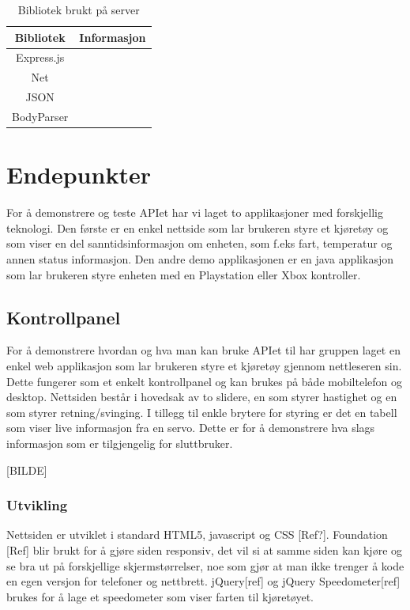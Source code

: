 \documentclass[12pt]{report}
\begin{document}
\begin{table}[H]
	\begin{tabular}{|c|c|}
		\hline 
		\textbf{Bibliotek }& \textbf{Informasjon} \\ 
		\hline 
		Express.js &   \\ 
		\hline 
		Net &  \\ 
		\hline 
		JSON &  	\\ 
		\hline 
		BodyParser &  	\\  
		\hline 
	\end{tabular} 
	\centering
	\caption{Bibliotek brukt på server}
	\label{serverBibliotek}
\end{table}

\chapter{Endepunkter}
For å demonstrere og teste APIet har vi laget to applikasjoner med forskjellig teknologi. Den første er en enkel nettside som lar brukeren styre et kjøretøy og som viser en del sanntidsinformasjon om enheten, som f.eks fart, temperatur og annen status informasjon. Den andre demo applikasjonen er en java applikasjon som lar brukeren styre enheten med en Playstation eller Xbox kontroller.

\section{Kontrollpanel}
For å demonstrere hvordan og hva man kan bruke APIet til har gruppen laget en enkel web applikasjon som lar brukeren styre et kjøretøy gjennom nettleseren sin. Dette fungerer som et enkelt kontrollpanel og kan brukes på både mobiltelefon og desktop. Nettsiden består i hovedsak av to slidere, en som styrer hastighet og en som styrer retning/svinging. I tillegg til enkle brytere for styring er det en tabell som viser live informasjon fra en servo. Dette er for å demonstrere hva slags informasjon som er tilgjengelig for sluttbruker.

[BILDE]

\subsection{Utvikling}
Nettsiden er utviklet i standard HTML5, javascript og CSS [Ref?]. Foundation [Ref] blir brukt for å gjøre siden responsiv, det vil si at samme siden kan kjøre og se bra ut på forskjellige skjermstørrelser, noe som gjør at man ikke trenger å kode en egen versjon for telefoner og nettbrett. jQuery[ref] og jQuery Speedometer[ref] brukes for å lage et speedometer som viser farten til kjøretøyet.
\end{document}

